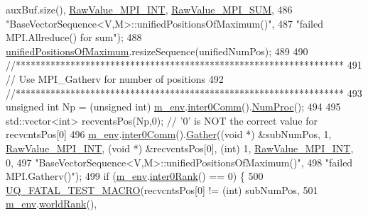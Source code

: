 \begin{DoxyCode}
      auxBuf.size(), \hyperlink{_mpi_comm_8h_a1f067da7be967aa1ff144738cadd3e57}{RawValue\_MPI\_INT}, \hyperlink{_mpi_comm_8h_afbf78d291c032aa7f512bc566cee2bd1}{RawValue\_MPI\_SUM},
486                                \textcolor{stringliteral}{"BaseVectorSequence<V,M>::unifiedPositionsOfMaximum()"},
487                                \textcolor{stringliteral}{"failed MPI.Allreduce() for sum"});
488   \hyperlink{class_q_u_e_s_o_1_1_base_vector_sequence_a4269482101b2bcdb1975543f8191ab4c}{unifiedPositionsOfMaximum}.resizeSequence(unifiedNumPos);
489 
490   \textcolor{comment}{//******************************************************************}
491   \textcolor{comment}{// Use MPI\_Gatherv for number of positions}
492   \textcolor{comment}{//******************************************************************}
493   \textcolor{keywordtype}{unsigned} \textcolor{keywordtype}{int} Np = (\textcolor{keywordtype}{unsigned} int) \hyperlink{class_q_u_e_s_o_1_1_base_vector_sequence_a8e8824d2a63c5a43bcc6473e3a0491e8}{m\_env}.\hyperlink{class_q_u_e_s_o_1_1_base_environment_a689e4d140c74d495d97eb498714a4b82}{inter0Comm}().\hyperlink{class_q_u_e_s_o_1_1_mpi_comm_aa780721ae0fdeabc5a15e04cb0cad964}{NumProc}();
494 
495   std::vector<int> recvcntsPos(Np,0); \textcolor{comment}{// '0' is NOT the correct value for recvcntsPos[0]}
496   \hyperlink{class_q_u_e_s_o_1_1_base_vector_sequence_a8e8824d2a63c5a43bcc6473e3a0491e8}{m\_env}.\hyperlink{class_q_u_e_s_o_1_1_base_environment_a689e4d140c74d495d97eb498714a4b82}{inter0Comm}().\hyperlink{class_q_u_e_s_o_1_1_mpi_comm_a184a5e411afcfb6dc41e99fca9435045}{Gather}((\textcolor{keywordtype}{void} *) &subNumPos, 1, 
      \hyperlink{_mpi_comm_8h_a1f067da7be967aa1ff144738cadd3e57}{RawValue\_MPI\_INT}, (\textcolor{keywordtype}{void} *) &recvcntsPos[0], (\textcolor{keywordtype}{int}) 1, 
      \hyperlink{_mpi_comm_8h_a1f067da7be967aa1ff144738cadd3e57}{RawValue\_MPI\_INT}, 0,
497                             \textcolor{stringliteral}{"BaseVectorSequence<V,M>::unifiedPositionsOfMaximum()"},
498                             \textcolor{stringliteral}{"failed MPI.Gatherv()"});
499   \textcolor{keywordflow}{if} (\hyperlink{class_q_u_e_s_o_1_1_base_vector_sequence_a8e8824d2a63c5a43bcc6473e3a0491e8}{m\_env}.\hyperlink{class_q_u_e_s_o_1_1_base_environment_ae106b5bb8a80b655b88b3a26b1e7c185}{inter0Rank}() == 0) \{
500     \hyperlink{_defines_8h_a56d63d18d0a6d45757de47fcc06f574d}{UQ\_FATAL\_TEST\_MACRO}(recvcntsPos[0] != (\textcolor{keywordtype}{int}) subNumPos,
501                         \hyperlink{class_q_u_e_s_o_1_1_base_vector_sequence_a8e8824d2a63c5a43bcc6473e3a0491e8}{m\_env}.\hyperlink{class_q_u_e_s_o_1_1_base_environment_a78b57112bbd0e6dd0e8afec00b40ffa7}{worldRank}(),

\end{DoxyCode}
